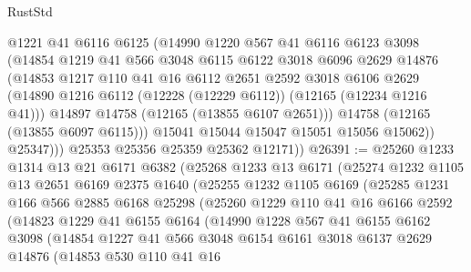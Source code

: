 \begin{lexlean}{RustStd}
\begin{coremodule}
                @1221
                @41
                @6116
                @6125
                (@14990
                  @1220
                  @567
                  @41
                  @6116
                  @6123
                  @3098
                  (@14854
                    @1219
                    @41
                    @566
                    @3048
                    @6115
                    @6122
                    @3018
                    @6096
                    @2629
                    @14876
                    (@14853
                      @1217
                      @110
                      @41
                      @16
                      @6112
                      @2651
                      @2592
                      @3018
                      @6106
                      @2629
                      (@14890 @1216 @6112 (@12228 (@12229 @6112)) (@12165 (@12234 @1216 @41)))
                      @14897
                      @14758
                      (@12165 (@13855 @6107 @2651)))
                    @14758
                    (@12165 (@13855 @6097 @6115)))
                  @15041
                  @15044
                  @15047
                  @15051
                  @15056
                  @15062))
              @25347)))
        @25353
        @25356
        @25359
        @25362
        @12171))
@26391 := @25260
    @1233
    @1314
    @13
    @21
    @6171
    @6382
    (@25268
      @1233
      @13
      @6171
      (@25274
        @1232
        @1105
        @13
        @2651
        @6169
        @2375
        @1640
        (@25255
          @1232
          @1105
          @6169
          (@25285
            @1231
            @166
            @566
            @2885
            @6168
            @25298
            (@25260
              @1229
              @110
              @41
              @16
              @6166
              @2592
              (@14823
                @1229
                @41
                @6155
                @6164
                (@14990
                  @1228
                  @567
                  @41
                  @6155
                  @6162
                  @3098
                  (@14854
                    @1227
                    @41
                    @566
                    @3048
                    @6154
                    @6161
                    @3018
                    @6137
                    @2629
                    @14876
                    (@14853
                      @530
                      @110
                      @41
                      @16

\end{coremodule}
\end{lexlean}
